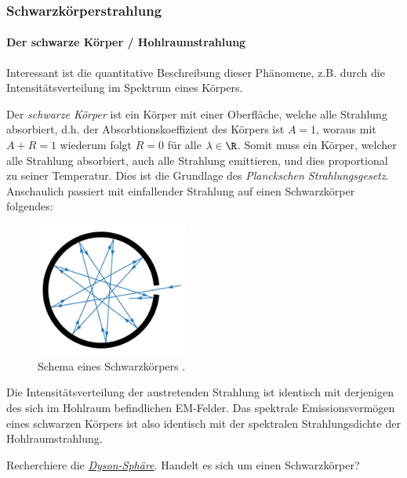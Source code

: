 \documentclass{subfiles}
\begin{document}
        \subsubsection{Schwarzkörperstrahlung}
            \paragraph*{Der schwarze Körper / Hohlraumstrahlung}

                Interessant ist die quantitative Beschreibung dieser Phänomene, z.B. durch die Intensitätsverteilung im Spektrum eines Körpers. 

                Der \emph{schwarze Körper} ist ein Körper mit einer Oberfläche, welche alle Strahlung absorbiert, d.h. der Absorbtionskoeffizient des Körpers ist $A=1$, woraus mit $A+R=1$ wiederum folgt $R=0$ für alle $\lambda\in\R$. Somit muss ein Körper, welcher alle Strahlung absorbiert, auch alle Strahlung emittieren, und dies proportional zu seiner Temperatur. Dies ist die Grundlage des \emph{Planckschen Strahlungsgesetz}. Anschaulich passiert mit einfallender Strahlung auf einen Schwarzkörper folgendes:
                \begin{figure}
                    \centering
                    \includegraphics[width=5cm]{Bilddateien/Black_body_realization.svg.png}
                    \caption{Schema eines Schwarzkörpers \cite{wiki:BlackBody}.}
                    \label{fig:SchwarzkoerperSchema}
                \end{figure}
                Die Intensitätsverteilung der austretenden Strahlung ist identisch mit derjenigen des sich im Hohlraum befindlichen EM-Felder. Das spektrale Emissionsvermögen eines schwarzen Körpers ist also identisch mit der spektralen Strahlungsdichte der Hohlraumstrahlung. 

                \begin{Aufgabe}
                    \nr{} Recherchiere die \href{https://de.wikipedia.org/wiki/Dyson-Sphäre}{\emph{Dyson-Sphäre}}. Handelt es sich um einen Schwarzkörper?
                \end{Aufgabe}
\end{document}
